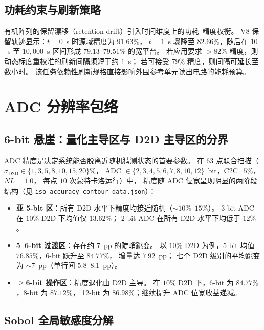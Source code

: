 \subsection{功耗约束与刷新策略}

有机阵列的保留漂移（retention drift）引入时间维度上的功耗--精度权衡。
V8 保留轨迹显示：$t=0$~s 时源域精度为 $91.63\%$，
$t=1$~s 骤降至 $82.66\%$，随后在 $10$~s 至 $10{,}000$~s 区间形成 $79.13$--$79.51\%$ 的宽平台。
若应用要求 $>82\%$ 精度，则动态标度重校准的刷新间隔须短于约 $1$~s；
若可接受 $79\%$ 精度，则间隔可延长至数小时。
该任务依赖性刷新规格直接影响外围参考单元读出电路的能耗预算。


\section{ADC 分辨率包络}
\label{sec:adc-envelope}

\subsection{6-bit 悬崖：量化主导区与 D2D 主导区的分界}

ADC 精度是决定系统能否脱离近随机猜测状态的首要参数。
在 $63$ 点联合扫描（$\sigma_{\mathrm{D2D}} \in \{1,3,5,8,10,15,20\}\%$，
ADC $\in \{2,3,4,5,6,7,8,10,12\}$~bit，C2C=$5\%$，$NL=1.0$，
每点 $10$ 次蒙特卡洛运行）中，
精度随 ADC 位宽呈现明显的两阶段结构（见 \texttt{iso\_accuracy\_contour\_data.json}）：

\begin{itemize}
    \item \textbf{亚 5-bit 区}：所有 D2D 水平下精度均接近随机（$\sim$$10\%$--$15\%$）。
    3-bit ADC 在 $10\%$ D2D 下均值仅 $13.62\%$；
    2-bit ADC 在所有 D2D 水平下均低于 $12\%$。
    \item \textbf{5--6-bit 过渡区}：存在约 $7$~pp 的陡峭跳变。
    以 $10\%$ D2D 为例，5-bit 均值 $76.85\%$，6-bit 跃升至 $84.77\%$，
    增量达 $7.92$~pp；
    七个 D2D 级别的平均跳变为 $\sim$$7$~pp（单行间 $5.8$--$8.1$~pp）。
    \item \textbf{$\ge$6-bit 操作区}：精度退化由 D2D 主导。
    在 $10\%$ D2D 下，6-bit 为 $84.77\%$，8-bit 为 $87.12\%$，
    12-bit 为 $86.98\%$；继续提升 ADC 位宽收益递减。
\end{itemize}

\subsection{Sobol 全局敏感度分解}

